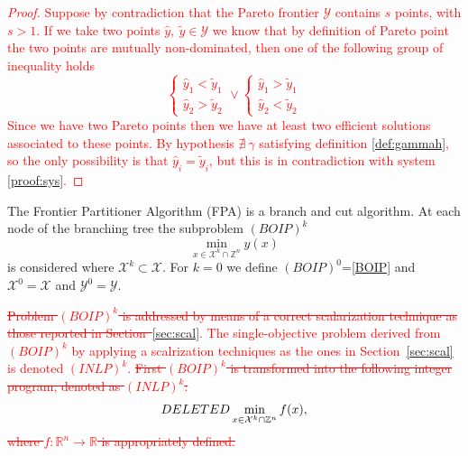 \documentclass[preprint,12pt]{elsarticle}
\newcommand{\red}[1]{\textcolor{red}{#1}}
\def\X{{\cal X}}
\def\R{\mathbb{R}}
\def\Z{\mathbb{Z}}
\begin{document}
\red{\begin{proof}
Suppose by contradiction that the Pareto frontier $\mathcal{Y}$ contains $s$ points, with $s>1$. If we take two points $\hat{y},\ \tilde{y} \in \mathcal{Y}$ we know that by definition of Pareto point the two points are mutually non-dominated, then one of the following group of inequality holds
\begin{equation}\label{proof:sys}
\left\{
\begin{array}{l}
     \hat{y}_1 < \tilde{y}_1  \\
      \hat{y}_2 > \tilde{y}_2
\end{array}
\right.
\vee
\left\{
\begin{array}{l}
     \hat{y}_1 > \tilde{y}_1  \\
      \hat{y}_2 < \tilde{y}_2
\end{array}
\right.
\end{equation}
Since we have two Pareto points then we have at least two efficient solutions associated to these points. By hypothesis $\nexists\  \gamma$ satisfying definition \ref{def:gammah}, so the only possibility is that $ \hat{y}_{\hat{i}} = \tilde{y}_{\hat{i}}$, but this is in contradiction with system \eqref{proof:sys}.
\end{proof}}



The Frontier Partitioner Algorithm (FPA) is a branch and cut algorithm. At each node of the branching tree the subproblem
$(BOIP)^k$
$$\min_{x\in \mathcal{X}^{k}\cap \Z^n} y(x)$$ is considered where $\mathcal{X}^{k}\subset \mathcal{X}$.
For $k=0$ we define $(BOIP)^0$=\eqref{BOIP} and $\mathcal{X}^0=\mathcal{X}$ and $\mathcal{Y}^0=\mathcal{Y}$.


\red{\st{Problem $(BOIP)^k$ is addressed by means of a correct scalarization technique as those reported in Section~}\ref{sec:scal}. The single-objective problem derived from $(BOIP)^k$ by applying a scalrization techniques as the ones in  Section~\ref{sec:scal} is denoted $(INLP)^k$. \st{  First
 $(BOIP)^k$ is transformed into the following integer program, denoted as $(INLP)^k$:}
\begin{equation}
 DELETED  \min_{x\in \mathcal{\X}^k\cap \Z^n} f(x),
\end{equation}
\st{where $f:\R^n\rightarrow \R$ is appropriately defined.}}
\end{document}
